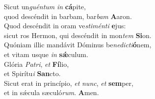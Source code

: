 \evenverse Sicut un\textit{guén}\textit{tum} \textit{in} \textbf{cá}pite,~\*\\
\evenverse quod descéndit in barbam, bar\textit{bam} \textbf{A}aron.\\
\oddverse Quod descéndit in oram ve\textit{sti}\textit{mén}\textit{ti} \textbf{e}jus:~\*\\
\oddverse sicut ros Hermon, qui descéndit in mon\textit{tem} \textbf{Si}on.\\
\evenverse Quóniam illic mandávit Dóminus be\textit{ne}\textit{di}\textit{cti}\textbf{ó}nem,~\*\\
\evenverse et vitam usque \textit{in} \textbf{sǽ}culum.\\
\oddverse Glória \textit{Pa}\textit{tri}, \textit{et} \textbf{Fí}lio,~\*\\
\oddverse et Spirítu\textit{i} \textbf{San}cto.\\
\evenverse Sicut erat in princípio, \textit{et} \textit{nunc}, \textit{et} \textbf{sem}per,~\*\\
\evenverse et in sǽcula sæculó\textit{rum}. \textbf{A}men.\\
